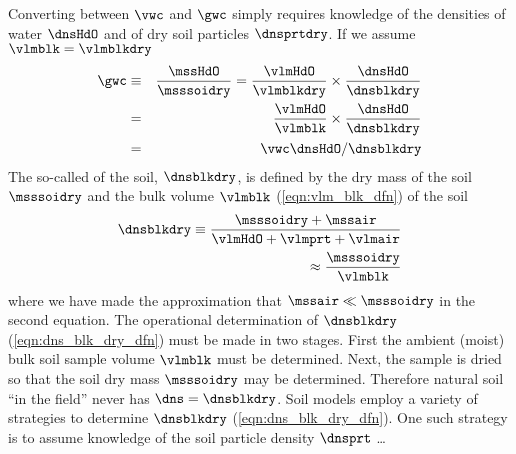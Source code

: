 \documentclass[12pt,twoside]{book}
\begin{document}
Converting between $\vwc$ and $\gwc$ simply requires knowledge of the
densities of water $\dnsHdO$ and of dry soil particles $\dnsprtdry$.
If we assume $\vlmblk = \vlmblkdry$
\begin{eqnarray}
\gwc & \equiv & \frac{\mssHdO}{\msssoidry} = 
\frac{\vlmHdO}{\vlmblkdry} \times 
\frac{\dnsHdO}{\dnsblkdry} \nonumber \\
& = & 
\frac{\vlmHdO}{\vlmblk} \times 
\frac{\dnsHdO}{\dnsblkdry} \nonumber \\
& = & 
\vwc \dnsHdO / \dnsblkdry
\end{eqnarray}
The so-called  of the soil, $\dnsblkdry$, is
defined by the dry mass of the soil $\msssoidry$ and the bulk volume
$\vlmblk$ (\ref{eqn:vlm_blk_dfn}) of the soil
\begin{eqnarray}
\dnsblkdry \equiv 
\frac{\msssoidry + \mssair}{\vlmHdO + \vlmprt + \vlmair} \nonumber \\
\approx \frac{\msssoidry}{\vlmblk}
\label{eqn:dns_blk_dry_dfn}
\end{eqnarray}
where we have made the approximation that $\mssair \ll \msssoidry$
in the second equation.
The operational determination of $\dnsblkdry$
(\ref{eqn:dns_blk_dry_dfn}) must be made in two stages. 
First the ambient (moist) bulk soil sample volume $\vlmblk$ must be
determined. 
Next, the sample is dried so that the soil dry mass $\msssoidry$ may
be determined.
Therefore natural soil ``in the field'' never has $\dns = \dnsblkdry$.
Soil models employ a variety of strategies to determine $\dnsblkdry$ 
(\ref{eqn:dns_blk_dry_dfn}).
One such strategy is to assume knowledge of the soil particle density
$\dnsprt$ \ldots
\end{document}
